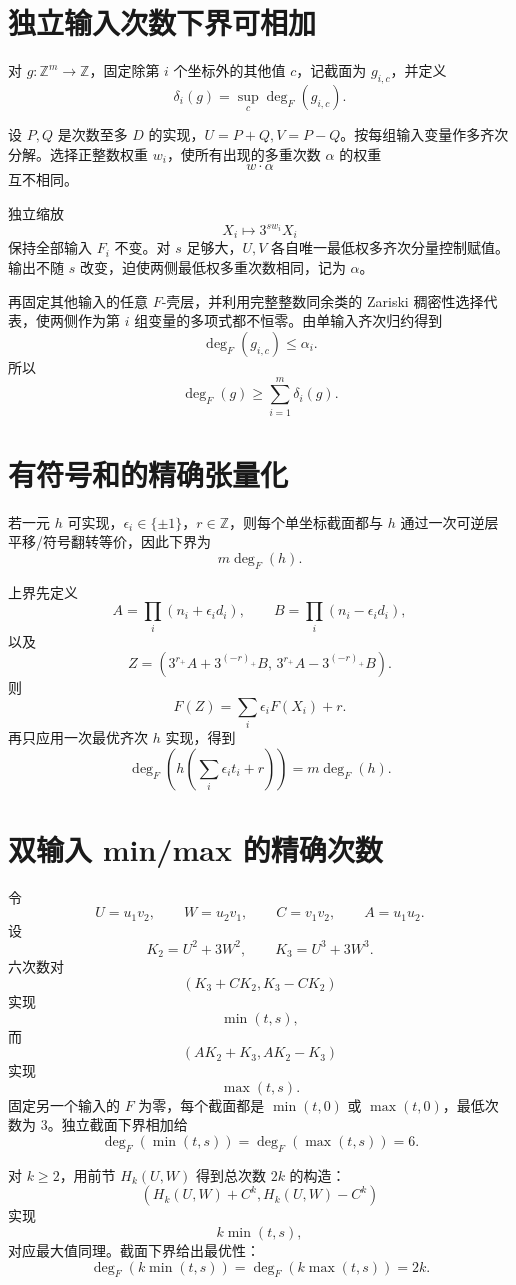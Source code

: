 \documentclass[11pt,a4paper]{ctexart}
\begin{document}
\section{独立输入次数下界可相加}
对 \(g:\mathbb Z^m\to\mathbb Z\)，固定除第 \(i\) 个坐标外的其他值 \(c\)，记截面为 \(g_{i,c}\)，并定义
\[
\delta_i(g)=\sup_c\deg_F(g_{i,c}).
\]

设 \(P,Q\) 是次数至多 \(D\) 的实现，\(U=P+Q,V=P-Q\)。按每组输入变量作多齐次分解。选择正整数权重 \(w_i\)，使所有出现的多重次数 \(\alpha\) 的权重
\[
w\cdot\alpha
\]
互不相同。

独立缩放
\[
X_i\mapsto3^{sw_i}X_i
\]
保持全部输入 \(F_i\) 不变。对 \(s\) 足够大，\(U,V\) 各自唯一最低权多齐次分量控制赋值。输出不随 \(s\) 改变，迫使两侧最低权多重次数相同，记为 \(\alpha\)。

再固定其他输入的任意 \(F\)-壳层，并利用完整整数同余类的 Zariski 稠密性选择代表，使两侧作为第 \(i\) 组变量的多项式都不恒零。由单输入齐次归约得到
\[
\deg_F(g_{i,c})\le\alpha_i.
\]
所以
\[
\boxed{
\deg_F(g)
\ge
\sum_{i=1}^m\delta_i(g).
}
\]

\section{有符号和的精确张量化}
若一元 \(h\) 可实现，\(\epsilon_i\in\{\pm1\}\)，\(r\in\mathbb Z\)，则每个单坐标截面都与 \(h\) 通过一次可逆层平移/符号翻转等价，因此下界为
\[
m\deg_F(h).
\]

上界先定义
\[
A=\prod_i(n_i+\epsilon_id_i),
\qquad
B=\prod_i(n_i-\epsilon_id_i),
\]
以及
\[
Z=(3^{r_+}A+3^{(-r)_+}B,\,
   3^{r_+}A-3^{(-r)_+}B).
\]
则
\[
F(Z)=\sum_i\epsilon_iF(X_i)+r.
\]
再只应用一次最优齐次 \(h\) 实现，得到
\[
\boxed{
\deg_F\left(
h\left(\sum_i\epsilon_it_i+r\right)
\right)
=
m\deg_F(h).
}
\]

\section{双输入 min/max 的精确次数}
令
\[
U=u_1v_2,\qquad
W=u_2v_1,\qquad
C=v_1v_2,\qquad
A=u_1u_2.
\]
设
\[
K_2=U^2+3W^2,
\qquad
K_3=U^3+3W^3.
\]
六次数对
\[
(K_3+CK_2,K_3-CK_2)
\]
实现
\[
\min(t,s),
\]
而
\[
(AK_2+K_3,AK_2-K_3)
\]
实现
\[
\max(t,s).
\]
固定另一个输入的 \(F\) 为零，每个截面都是 \(\min(t,0)\) 或 \(\max(t,0)\)，最低次数为 \(3\)。独立截面下界相加给
\[
\boxed{
\deg_F(\min(t,s))
=
\deg_F(\max(t,s))
=
6.
}
\]

对 \(k\ge2\)，用前节 \(H_k(U,W)\) 得到总次数 \(2k\) 的构造：
\[
(H_k(U,W)+C^k,H_k(U,W)-C^k)
\]
实现
\[
k\min(t,s),
\]
对应最大值同理。截面下界给出最优性：
\[
\boxed{
\deg_F(k\min(t,s))
=
\deg_F(k\max(t,s))
=
2k.
}
\]
\end{document}
